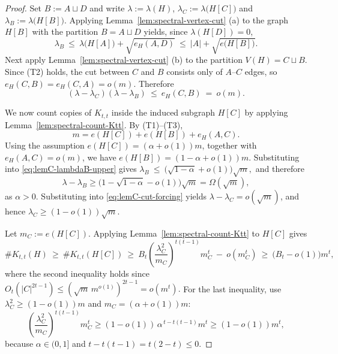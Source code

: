 \documentclass[11pt]{article}
\theoremstyle{definition}
\theoremstyle{plain}
\newcommand{\Ktt}{K_{t,t}}
\begin{document}
\begin{proof}  
Set $B:=A\sqcup D$ and write 
$ \lambda:=\lambda(H)$, $ \lambda_C:=\lambda\bigl(H[C]\bigr)$ 
and $ \lambda_B:=\lambda\bigl(H[B]\bigr)$.  
Applying Lemma~\ref{lem:spectral-vertex-cut} \textup{(a)} to the graph $H[B]$ with the partition $B=A\sqcup D$ yields, since \(\lambda(H[D])=0\),
\begin{equation}\label{eq:lemC-lambdaB-upper}
  \lambda_B
  \ \le\
  \lambda\bigl(H[A]\bigr)+\sqrt{e_H(A,D)}
  \ \le\
  |A|+\sqrt{e\bigl(H[B]\bigr)}.
\end{equation} 
Next apply Lemma~\ref{lem:spectral-vertex-cut} \textup{(b)} to the partition $V(H)=C\sqcup B$.
Since \textup{(T2)} holds, the cut between $C$ and $B$ consists only of $A$--$C$ edges, so $e_H(C,B)=e_H(C,A)=o(m)$.
Therefore
\begin{equation}\label{eq:lemC-cut-forcing}
  (\lambda-\lambda_C)(\lambda-\lambda_B)\ \le\ e_H(C,B)\ =\ o(m).
\end{equation}

We now count copies of $\Ktt$ inside the induced subgraph  $H[C]$ by applying Lemma~\ref{lem:spectral-count-Ktt}. 
By \textup{(T1)}--\textup{(T3)},
\[
  m = e (H[C]) + e(H[B]) + e_H(A,C) .
\] 
Using the assumption $e(H[C])=(\alpha+o(1))m$, together with  $e_H(A,C)=o(m)$, we have $e(H[B])=(1-\alpha+o(1))m$. 
Substituting into \eqref{eq:lemC-lambdaB-upper} gives $\lambda_B\ \le\ \bigl(\sqrt{1-\alpha}+o(1)\bigr)\sqrt m,$
and therefore
\[
        \lambda-\lambda_B
        \ge 
        \bigl(1- \sqrt{1-\alpha} - o(1) \bigr) \sqrt{m}
        =
        \Omega(\sqrt m),
\]
as $\alpha >0$. 
Substituting into \eqref{eq:lemC-cut-forcing} yields $\lambda-\lambda_C=o(\sqrt m)$, and hence $\lambda_C\ge (1-o(1))\sqrt m$. 

Let \(m_C:=e(H[C])\).
Applying Lemma~\ref{lem:spectral-count-Ktt} to $H[C]$ gives
\[
  \texttt{\#}\Ktt(H)
  \ \ge\
  \texttt{\#}\Ktt(H[C])
  \ \ge\
  B_t\left(\frac{\lambda_C^2}{m_C}\right)^{t(t-1)}m_C^t\ -\ o(m_C^t)
  \ \ge \
  \bigl(B_t-o(1)\bigr)m^t,
\]
where the second inequality holds since $O_t(|C|^{2t-1})
        \le
        \left(\sqrt m\,m^{o(1)}\right)^{2t-1}
        =
        o(m^t).$
For the last inequality, use \(\lambda_C^2\ge (1-o(1))m\) and \(m_C=(\alpha+o(1))m\):
\[
  \left(\frac{\lambda_C^2}{m_C}\right)^{t(t-1)}m_C^t
  \ge
  (1-o(1))\,\alpha^{\,t-t(t-1)}m^t
  \ge
  (1-o(1))m^t,
\]
because \(\alpha\in(0,1]\) and \(t-t(t-1)=t(2-t)\le0\).
\end{proof}
\end{document}
